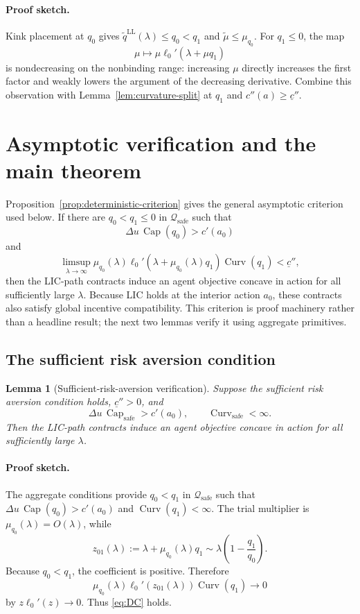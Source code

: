 \documentclass[11pt]{article}
\newtheorem{lemma}{Lemma}
\theoremstyle{remark}
\newcommand{\cQ}{\mathcal Q}
\DeclareMathOperator{\Capacity}{Cap}
\DeclareMathOperator{\Curv}{Curv}
\newcommand{\proofsketch}{\paragraph{Proof sketch.}}
\begin{document}
\proofsketch
Kink placement at $q_0$ gives
$\widetilde q^{\mathrm{LL}}(\lambda)\le q_0<q_1$ and
$\widetilde\mu\le\mu_{q_0}$.  For $q_1\le0$, the map
\[
 \mu\longmapsto \mu\ell_0'(\lambda+\mu q_1)
\]
is nondecreasing on the nonbinding range: increasing $\mu$ directly increases
the first factor and weakly lowers the argument of the decreasing derivative.
Combine this observation with Lemma~\ref{lem:curvature-split} at $q_1$ and
$c''(a)\ge\underline c''$.

\section{Asymptotic verification and the main theorem}

Proposition~\ref{prop:deterministic-criterion} gives the general asymptotic
criterion used below.  If there are $q_0<q_1\le0$ in
$\cQ_{\mathrm{safe}}$ such that
\[
 \Delta u\,\Capacity(q_0)>c'(a_0)
\]
and
\begin{equation}
 \limsup_{\lambda\to\infty}
 \mu_{q_0}(\lambda)
 \ell_0'(\lambda+\mu_{q_0}(\lambda)q_1)\Curv(q_1)
 <\underline c'',
 \tag{DC}\label{eq:DC}
\end{equation}
then the LIC-path contracts induce an agent objective concave in action for all
sufficiently large $\lambda$.  Because LIC holds at the interior action $a_0$,
these contracts also satisfy global incentive compatibility.  This criterion is
proof machinery rather than a headline result; the next two lemmas verify it
using aggregate primitives.

\subsection{The sufficient risk aversion condition}

\begin{lemma}[Sufficient-risk-aversion verification]
\label{lem:vanishing-marginal-utility}
Suppose the sufficient risk aversion condition holds,
$\underline c''>0$, and
\[
 \Delta u\,\Capacity_{\mathrm{safe}}>c'(a_0),
 \qquad
 \Curv_{\mathrm{safe}}<\infty.
\]
Then the LIC-path contracts induce an agent objective concave in action for all
sufficiently large $\lambda$.
\end{lemma}

\proofsketch
The aggregate conditions provide $q_0<q_1$ in $\cQ_{\mathrm{safe}}$ such that
$\Delta u\,\Capacity(q_0)>c'(a_0)$ and $\Curv(q_1)<\infty$.  The trial
multiplier is $\mu_{q_0}(\lambda)=O(\lambda)$, while
\[
 z_{01}(\lambda):=\lambda+\mu_{q_0}(\lambda)q_1
 \sim \lambda\left(1-\frac{q_1}{q_0}\right).
\]
Because $q_0<q_1$, the coefficient is positive.  Therefore
\[
 \mu_{q_0}(\lambda)\ell_0'(z_{01}(\lambda))\Curv(q_1)\longrightarrow0
\]
by $z\ell_0'(z)\to0$.  Thus \eqref{eq:DC} holds.
\end{document}
